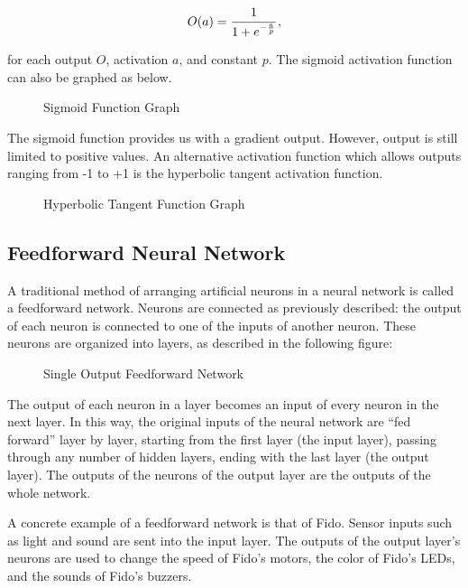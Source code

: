 \begin{equation}
	O(a) = \cfrac{1}{1+e^{-\frac{a}{p}}}
	\,,
\end{equation}

\noindent for each output $O$, activation $a$, and constant $p$. The sigmoid activation function can also be graphed as below.

\begin{figure}[ht]
	\centering
	
	\caption{Sigmoid Function Graph}
\end{figure}

The sigmoid function provides us with a gradient output. However, output is still limited to positive values. An alternative activation function which allows outputs ranging from -1 to +1 is the hyperbolic tangent activation function.

\begin{figure}[ht]
	\centering
	
	\caption{Hyperbolic Tangent Function Graph}
\end{figure}

\subsection{Feedforward Neural Network}

A traditional method of arranging artificial neurons in a neural network is called a feedforward network. Neurons are connected as previously described: the output of each neuron is connected to one of the inputs of another neuron. These neurons are organized into layers, as described in the following figure:

\begin{figure}[ht]
	\centering
	
	\caption{Single Output Feedforward Network}
\end{figure}

The output of each neuron in a layer becomes an input of every neuron in the next layer. In this way, the original inputs of the neural network are ``fed forward'' layer by layer, starting from the first layer (the input layer), passing through any number of hidden layers, ending with the last layer (the output layer). The outputs of the neurons of the output layer are the outputs of the whole network.

A concrete example of a feedforward network is that of Fido. Sensor inputs such as light and sound are sent into the input layer. The outputs of the output layer's neurons are used to change the speed of Fido's motors, the color of Fido's LEDs, and the sounds of Fido's buzzers.